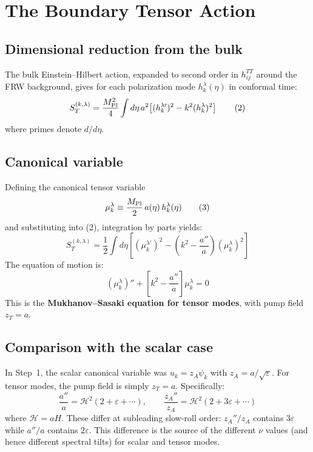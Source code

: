 \documentclass[12pt,a4paper]{article}
\begin{document}
\section{The Boundary Tensor Action}

\subsection{Dimensional reduction from the bulk}

The bulk Einstein--Hilbert action, expanded to second order in $h_{ij}^{TT}$ around the FRW background, gives for each polarization mode $h_k^\lambda(\eta)$ in conformal time:
\begin{equation}
S_T^{(k,\lambda)} = \frac{M_{\rm Pl}^2}{4}\int d\eta\, a^2\!\left[(h_k^{\lambda\prime})^2 - k^2(h_k^\lambda)^2\right] \tag{2}
\end{equation}
where primes denote $d/d\eta$.

\subsection{Canonical variable}

Defining the canonical tensor variable
\begin{equation}
\mu_k^\lambda \equiv \frac{M_{\rm Pl}}{2}\,a(\eta)\,h_k^\lambda(\eta) \tag{3}
\end{equation}
and substituting into (2), integration by parts yields:
\begin{equation}
S_T^{(k,\lambda)} = \frac{1}{2}\int d\eta\!\left[(\mu_k^{\lambda\prime})^2 - \left(k^2 - \frac{a''}{a}\right)(\mu_k^\lambda)^2\right] \tag{4}
\end{equation}
The equation of motion is:
\begin{equation}
(\mu_k^\lambda)'' + \left[k^2 - \frac{a''}{a}\right]\mu_k^\lambda = 0 \tag{5}
\end{equation}
This is the \textbf{Mukhanov--Sasaki equation for tensor modes}, with pump field $z_T = a$.

\subsection{Comparison with the scalar case}

In Step~1, the scalar canonical variable was $u_k = z_A\psi_k$ with $z_A = a/\sqrt\varepsilon$. For tensor modes, the pump field is simply $z_T = a$. Specifically:
\begin{equation}
\frac{a''}{a} = \mathcal{H}^2(2 + \varepsilon + \cdots), \qquad \frac{z_A''}{z_A} = \mathcal{H}^2(2 + 3\varepsilon + \cdots) \tag{6}
\end{equation}
where $\mathcal{H} = aH$. These differ at subleading slow-roll order: $z_A''/z_A$ contains $3\varepsilon$ while $a''/a$ contains $2\varepsilon$. This difference is the source of the different $\nu$ values (and hence different spectral tilts) for scalar and tensor modes.
\end{document}
